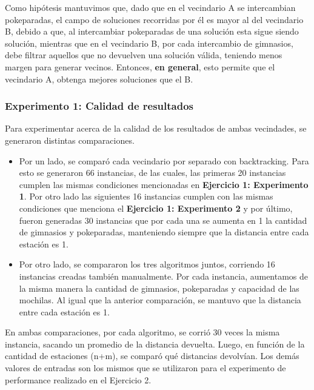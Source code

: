             Como hipótesis mantuvimos que, dado que en el vecindario A se intercambian pokeparadas, el campo de soluciones recorridas por él es mayor al del vecindario B, debido a que, al intercambiar pokeparadas de una solución esta sigue siendo solución, mientras que en el vecindario B, por cada intercambio de gimnasios, debe filtrar aquellos que no devuelven una solución válida, teniendo menos margen para generar vecinos. Entonces, \textbf{en general}, esto permite que el vecindario A, obtenga mejores soluciones que el B. 

        \subsubsection{Experimento 1: Calidad de resultados} 

            Para experimentar acerca de la calidad de los resultados de ambas vecindades, se generaron distintas comparaciones. 

            \begin{itemize}
                \item Por un lado, se comparó cada vecindario por separado con backtracking. Para esto se generaron 66 instancias, de las cuales, las primeras 20 instancias cumplen las mismas condiciones mencionadas en \textbf{Ejercicio 1: Experimento 1}. Por otro lado las siguientes 16 instancias  cumplen con las mismas condiciones que menciona el \textbf{Ejercicio 1: Experimento 2} y por último, fueron generadas 30 instancias que por cada una se aumenta en 1 la cantidad de gimnasios y pokeparadas, manteniendo siempre que la distancia entre cada estación es 1.
 
                \item Por otro lado, se compararon los tres algoritmos juntos, corriendo 16 instancias creadas también manualmente. Por cada instancia, aumentamos de la misma manera la cantidad de gimnasios, pokeparadas y capacidad de las mochilas. Al igual que la anterior comparación, se mantuvo que la distancia entre cada estación es 1.
            \end{itemize}

             En ambas comparaciones, por cada algoritmo, se corrió 30 veces la misma instancia, sacando un promedio de la distancia devuelta. Luego, en función de la cantidad de estaciones (n+m), se comparó qué distancias devolvían. Los demás valores de entradas son los mismos que se utilizaron para el experimento de performance realizado en el Ejercicio 2.
			 
